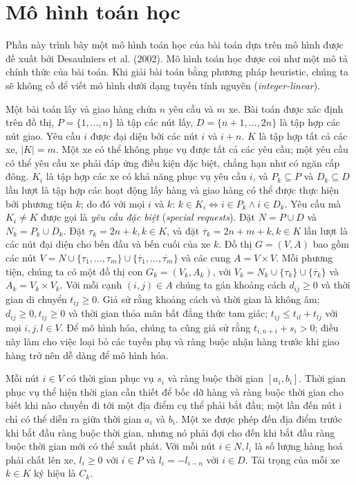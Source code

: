 \chapter{Mô hình toán học}
Phần này trình bày một mô hình toán học của bài toán dựa trên mô hình được đề xuất bởi Desaulniers et al. (2002). Mô hình toán học được coi như một mô tả chính thức của bài toán. Khi giải bài toán bằng phương pháp heuristic, chúng ta sẽ không cố để viết mô hình dưới dạng tuyến tính nguyên (\textit{integer-linear}).

Một bài toán lấy và giao hàng chứa $n$ yêu cầu và $m$ xe. Bài toán được xác định trên đồ thị, $P = \{1,...,n\}$ là tập các nút lấy, $D=\{n+1,...,2n\}$ là tập hợp các nút giao. Yêu cầu $i$ được đại diện bởi các nút $i$ và $i + n$. $K$ là tập hợp tất cả các xe, $|K|=m$. Một xe có thể không phục vụ được tất cả các yêu cầu; một yêu cầu có thể yêu cầu xe phải đáp ứng điều kiện đặc biệt, chẳng hạn như có ngăn cấp đông. $K_i$ là tập hợp các xe có khả năng phục vụ yêu cầu $i$, và $P_k \subseteq P$ và $D_k \subseteq D$ lần lượt là tập hợp các hoạt động lấy hàng và giao hàng có thể được thực hiện bởi phương tiện $k$; do đó với mọi $i$ và $k$: $k \in K_i \Leftrightarrow i \in P_k \land i \in D_k $. Yêu cầu mà $K_i \ne K$ được gọi là \textit{yêu cầu đặc biệt} (\textit{special requests}). Đặt $N = P \cup D$ và $N_k = P_k \cup D_k$. Đặt $\tau_k = 2n +k, k \in K$, và đặt $\acute{\tau_k} = 2n + m +k, k \in K$ lần lượt là các nút đại diện cho bến đầu và bến cuối của xe $k$. 
Đồ thị $G = (V,A)$ bao gồm các nút $V= N \cup \{ \tau_1,...,\tau_m\} \cup \{\acute{\tau_1},...,\acute{\tau_m}\}$ và các cung $A = V \times V$. Mỗi phương tiện, chúng ta có một đồ thị con $G_k = (V_k, A_k)$, với $V_k = N_k \cup \{\tau_k\} \cup \{\acute{\tau_k}\}$ và $A_k =V_k \times V_k$. Với mỗi cạnh $(i, j) \in A$ chúng ta gán khoảng cách $d_{ij} \geq 0$ và thời gian di chuyển $t_{ij} \geq 0$. Giả sử rằng khoảng cách và thời gian là không âm; $d_{ij} \geq 0, t_{ij} \geq 0$ và thời gian thỏa mãn bất đẳng thức tam giác; $t_{ij} \leq t_{il} + t_{lj}$ với mọi $i, j, l \in V$.
Để mô hình hóa, chúng ta cũng giả sử rằng $t_{i,n+i} + s_i > 0$; điều này làm cho việc loại bỏ các tuyến phụ và ràng buộc nhận hàng trước khi giao hàng trở nên dễ dàng để mô hình hóa.

Mỗi nút $i \in V$ có thời gian phục vụ $s_i$ và ràng buộc thời gian $[a_i, b_i]$. Thời gian phục vụ thể hiện thời gian cần thiết để bốc dỡ hàng và ràng buộc thời gian cho biết khi nào chuyến đi tới một địa điểm cụ thể phải bắt đầu; một lần đến nút i chỉ có thể diễn ra giữa thời gian $a_i$ và $b_i$. Một xe được phép đến địa điểm trước khi bắt đầu ràng buộc thời gian, nhưng nó phải đợi cho đến khi bắt đầu ràng buộc thời gian mới có thể xuất phát. Với mỗi nút $i \in N, l_i$ là số lượng hàng hoá phải chất lên xe, $l_i \geq 0$ với $i \in P$ và $l_i = -l_{i-n}$ với $i \in D$. Tải trọng của mỗi xe $k \in K$ ký hiệu là $C_k$.


